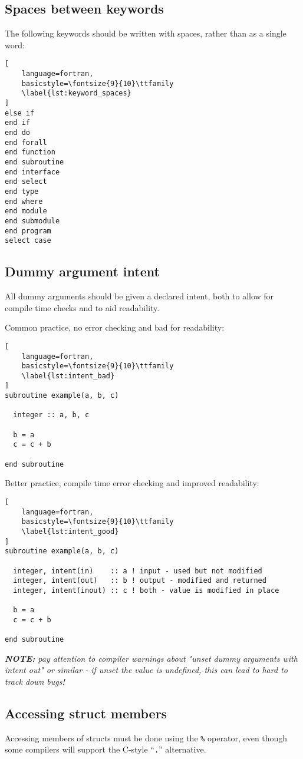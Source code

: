 \documentclass[11pt]{article}
\begin{document}
\subsection{Spaces between keywords}
The following keywords should be written with spaces, rather than as a single word:
\begin{lstlisting}[
	language=fortran,
    basicstyle=\fontsize{9}{10}\ttfamily
    \label{lst:keyword_spaces}
]
else if
end if
end do
end forall
end function
end subroutine
end interface
end select
end type
end where
end module
end submodule
end program
select case
\end{lstlisting}

\subsection{Dummy argument intent}
All dummy arguments should be given a declared intent, both to allow for compile time checks and to aid readability.

Common practice, no error checking and bad for readability:
\begin{lstlisting}[
	language=fortran,
    basicstyle=\fontsize{9}{10}\ttfamily
    \label{lst:intent_bad}
]
subroutine example(a, b, c)

  integer :: a, b, c

  b = a
  c = c + b

end subroutine
\end{lstlisting}

Better practice, compile time error checking and improved readability:
\begin{lstlisting}[
	language=fortran,
    basicstyle=\fontsize{9}{10}\ttfamily
    \label{lst:intent_good}
]
subroutine example(a, b, c)

  integer, intent(in)    :: a ! input - used but not modified
  integer, intent(out)   :: b ! output - modified and returned
  integer, intent(inout) :: c ! both - value is modified in place
  
  b = a
  c = c + b

end subroutine
\end{lstlisting}

\textit{\textbf{NOTE:} pay attention to compiler warnings about "unset dummy arguments with intent out" or similar - if unset the value is undefined, this can lead to hard to track down bugs!}

\subsection{Accessing struct members}
Accessing members of structs must be done using the \texttt{\%} operator, even though some compilers will support 
the C-style ``\texttt{.}'' alternative.
\end{document}
